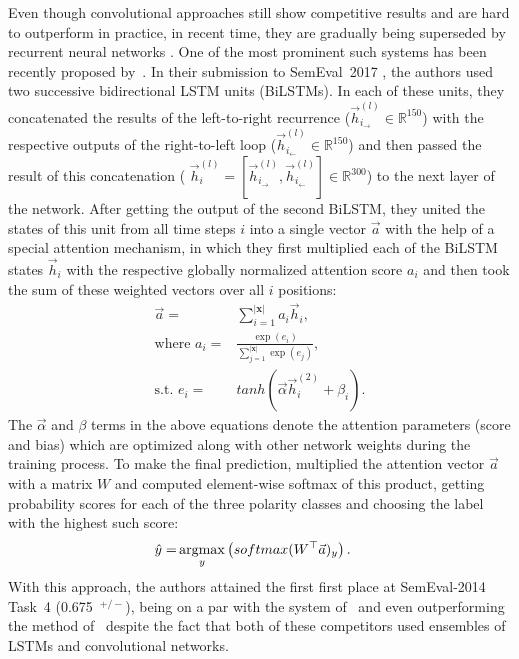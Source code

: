 Even though convolutional approaches still show competitive results
and are hard to outperform in practice, in recent time, they are
gradually being superseded by recurrent neural networks
\cite{Xu:16,Wang:15}.  One of the most prominent such systems has been
recently proposed by~\citet{Baziotis:17}.  In their submission to
SemEval~2017 \cite{Rosenthal:17}, the authors used two successive
bidirectional LSTM units (BiLSTMs).  In each of these units, they
concatenated the results of the left-to-right recurrence
($\vec{h}^{(l)}_{i_{\rightarrow}}\in\mathbb{R}^{150}$) with the
respective outputs of the right-to-left loop
($\vec{h}^{(l)}_{i_{\leftarrow}}\in\mathbb{R}^{150}$) and then passed
the result of this concatenation ( $\vec{h}_i^{(l)} =
[\vec{h}^{(l)}_{i_{\rightarrow}},
  \vec{h}^{(l)}_{i_{\leftarrow}}]\in\mathbb{R}^{300}$) to the next
layer of the network.  After getting the output of the second BiLSTM,
they united the states of this unit from all time steps $i$ into a
single vector $\vec{a}$ with the help of a special attention
mechanism, in which they first multiplied each of the BiLSTM states
$\vec{h}_i$ with the respective globally normalized attention score
$a_i$ and then took the sum of these weighted vectors over all $i$
positions:
\begin{align}
  \vec{a} =&
  \sum_{i=1}^{|\mathbf{x}|}a_i\vec{h}_i,\nonumber\\ \mbox{where }a_i
  =&
  \frac{\exp(e_i)}{\sum_{j=1}^{|\mathbf{x}|}\exp(e_j)},\nonumber\\ \textrm{s.t. }e_i
  =& tanh\left(\vec{\alpha}\vec{h}^{(2)}_i + \beta_i\right).
\end{align}\label{eq:cgsa:baziotis-attention}%
The $\vec{\alpha}$ and $\beta$ terms in the above equations denote the
attention parameters (score and bias) which are optimized along with
other network weights during the training process.  To make the final
prediction, \citeauthor{Baziotis:17} multiplied the attention vector
$\vec{a}$ with a matrix $W$ and computed element-wise softmax of this
product, getting probability scores for each of the three polarity
classes and choosing the label with the highest such score:
\begin{align}
  \hat{y} =& \argmax_y\left(softmax(W^\top\vec{a})_y\right).
\end{align}
\noindent With this approach, the authors attained the first first
place at SemEval-2014 Task~4 (0.675~\F{}$^{+/-}$), being on a par with
the system of~\citet{Cliche:17} and even outperforming the method
of~\citet{Rouvier:17} despite the fact that both of these competitors
used ensembles of LSTMs and convolutional networks.

